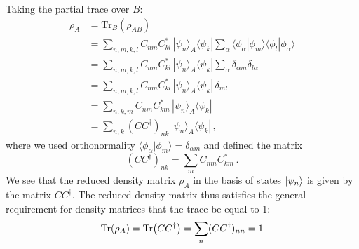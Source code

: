 \documentclass[12pt,oneside,openright]{report}
\theoremstyle{definition}
\theoremstyle{plain}
\theoremstyle{remark}
\begin{document}
Taking the partial trace over $B$:
\begin{align}
\rho_A &= \text{Tr}_B(\rho_{AB}) \nonumber\\
&= \sum_{n,m,k,l} C_{nm} C_{kl}^{*} \, |\psi_n\rangle_A\langle\psi_k| \sum_{\alpha} \langle\phi_\alpha|\phi_m\rangle\langle\phi_l|\phi_\alpha\rangle \nonumber\\
&= \sum_{n,m,k,l} C_{nm} C_{kl}^{*} \, |\psi_n\rangle_A\langle\psi_k| \sum_{\alpha} \delta_{\alpha m}\delta_{l\alpha} \nonumber\\
&= \sum_{n,m,k,l} C_{nm} C_{kl}^{*} \, |\psi_n\rangle_A\langle\psi_k| \, \delta_{ml} \nonumber\\
&= \sum_{n,k,m} C_{nm} C_{km}^{*} \, |\psi_n\rangle_A\langle\psi_k| \nonumber\\
&= \sum_{n,k} (CC^\dagger)_{nk} \, |\psi_n\rangle_A\langle\psi_k|\,,
\label{eq:rhoA_matrix_form}
\end{align}
where we used orthonormality $\langle\phi_\alpha|\phi_m\rangle = \delta_{\alpha m}$ and defined the matrix
\begin{equation}
(CC^\dagger)_{nk} = \sum_m C_{nm} C_{km}^{*}\,.
\end{equation}
We see that the reduced density matrix $\rho_A$  in the basis of states $ \ket{\psi_n} $ is given by the matrix $C C^{\dagger}$.
The reduced density matrix thus satisfies the general requirement for density matrices that
the trace be equal to 1:
\begin{equation}
  \Tr(\rho_A) = \Tr(C C^{\dagger}) = \sum_{n} (C C^{\dagger})_{nn} = 1
\end{equation}
\end{document}
